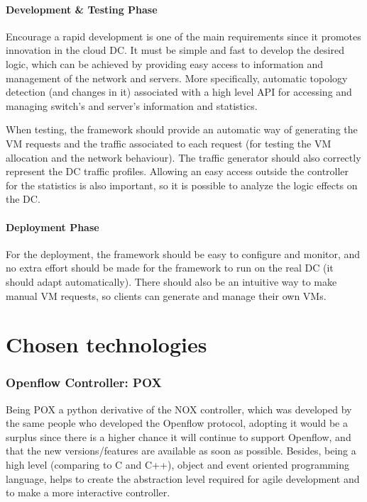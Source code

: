 \documentclass[12pt,english,oneside]{book}
\begin{document}
\paragraph{Development \& Testing Phase}
\hspace{0.6cm}

Encourage a rapid development is one of the main requirements since it promotes innovation in the cloud DC.
It must be simple and fast to develop the desired logic, which can be achieved by providing easy access to information and management of the network and servers.
More specifically, automatic topology detection (and changes in it) associated with a high level API for accessing and managing switch's and server's information and statistics.

When testing, the framework should provide an automatic way of generating the VM requests and the traffic associated to each request (for testing the VM allocation and the network behaviour).
The traffic generator should also correctly represent the DC traffic profiles.
Allowing an easy access outside the controller for the statistics is also important, so it is possible to analyze the logic effects on the DC.

\paragraph{Deployment Phase}
\hspace{0.6cm}

For the deployment, the framework should be easy to configure and monitor, and no extra effort should be made for the framework to run on the real DC (it should adapt automatically). There should also be an intuitive way to make manual VM requests, so clients can generate and manage their own VMs.

\section{Chosen technologies}

\subsubsection{Openflow Controller: POX}
\hspace{0.6cm}

Being POX a python derivative of the NOX controller, which was developed by the same people who developed the Openflow protocol, adopting it would be a surplus since there is a higher chance it will continue to support Openflow, and that the new versions/features are available as soon as possible.
Besides, being a high level (comparing to C and C++), object and event oriented programming language, helps to create the abstraction level required for agile development and to make a more interactive controller.
\end{document}
